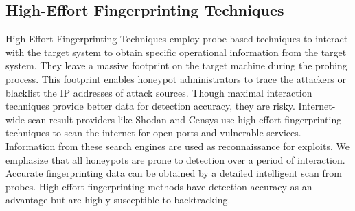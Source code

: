  
 \subsection{High-Effort Fingerprinting Techniques}
High-Effort Fingerprinting Techniques employ probe-based techniques to interact with the target system to obtain specific operational information from the target system. They leave a massive footprint on the target machine during the probing process. This footprint enables honeypot administrators to trace the attackers or blacklist the IP addresses of attack sources. Though maximal interaction techniques provide better data for detection accuracy, they are risky. Internet-wide scan result providers like Shodan and Censys use high-effort fingerprinting techniques to scan the internet for open ports and vulnerable services. Information from these search engines are used as reconnaissance for exploits. We emphasize that all honeypots are prone to detection over a period of interaction. Accurate fingerprinting data can be obtained by a detailed intelligent scan from probes. High-effort fingerprinting methods have detection accuracy as an advantage but are highly susceptible to backtracking. 
